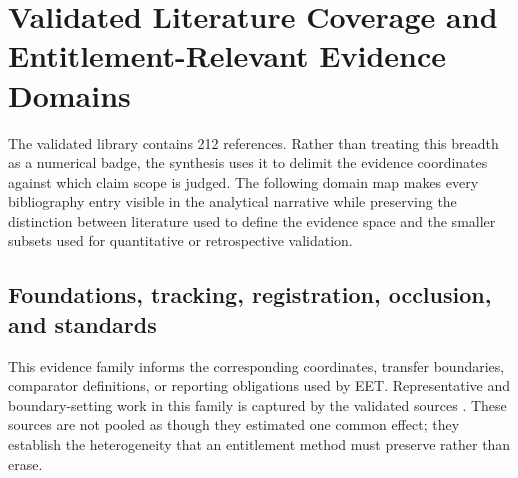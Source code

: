 \section{Validated Literature Coverage and Entitlement-Relevant Evidence Domains}
The validated library contains 212 references. Rather than treating this breadth as a numerical badge, the synthesis uses it to delimit the evidence coordinates against which claim scope is judged. The following domain map makes every bibliography entry visible in the analytical narrative while preserving the distinction between literature used to define the evidence space and the smaller subsets used for quantitative or retrospective validation.

\subsection{Foundations, tracking, registration, occlusion, and standards}
This evidence family informs the corresponding coordinates, transfer boundaries, comparator definitions, or reporting obligations used by EET. Representative and boundary-setting work in this family is captured by the validated sources \cite{Sheng2024SLAMReview,Zhang2026PoseEstimationReview,Macedo2023Occlusion,Klein2007PTAM,MurArtal2015ORBSLAM,MurArtal2017ORBSLAM2,Qin2018VINSMono,Campos2021ORBSLAM3,Sarlin2022LaMAR,Chegini2023RegistrationValidation,Kim2024MarkerlessSurgery,Schneider2020LiverRegistration,Wang2005Occlusion,Tian2010Occlusion,Li2022MonocularOcclusion,Fan2026DepthCueConflict,Blum2025CroCoDL,Elmqaddem2026Augmentiverse,Pan2023AriaDigitalTwin,Hu2025XRRealityCheck,Makamara2022XRStandards,Zhou2008ISMARTrends,Baragash2022OlderAdultsXR,SadeghiNiaraki2020MarkerlessSurvey,Schubert2018TUMVI,Fan2021ARAssetTracking,Alfakhori2026SituatedUrbanAR}. These sources are not pooled as though they estimated one common effect; they establish the heterogeneity that an entitlement method must preserve rather than erase.

